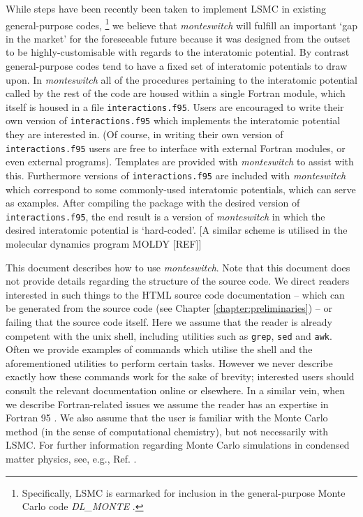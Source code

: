\documentclass{report}
\begin{document}
While steps have been recently been taken to implement LSMC in existing general-purpose codes,
\footnote{Specifically, LSMC is earmarked for inclusion in the general-purpose Monte Carlo code \emph{DL\_MONTE} \cite{Purton_2013}.}
we believe that \emph{monteswitch} will fulfill
an important `gap in the market' for the foreseeable future because it was designed from the outset to be highly-customisable with regards to the 
interatomic potential. By contrast general-purpose codes tend to have a fixed set of interatomic potentials to draw upon.
In \emph{monteswitch} all of the procedures pertaining to the interatomic potential called by the rest of the code are housed within 
a single Fortran module, which itself is housed in a file \texttt{interactions.f95}. 
Users are encouraged to write their own version of \texttt{interactions.f95} which implements the interatomic potential they are interested in.
(Of course, in writing their own version of \texttt{interactions.f95} users are free to interface with external Fortran modules, or even external 
programs). 
Templates are provided with \emph{monteswitch} to assist with this. Furthermore versions of \texttt{interactions.f95} are included
with \emph{monteswitch} which correspond to some commonly-used interatomic potentials, which can serve as examples.
After compiling the package with the desired version of \texttt{interactions.f95}, the end result is a version of \emph{monteswitch} 
in which the desired interatomic potential is `hard-coded'.
[A similar scheme is utilised in the molecular dynamics program MOLDY [REF]]

This document describes how to use \emph{monteswitch}. Note that this document does not provide details regarding the structure of the source code. 
We direct readers interested in such things to the HTML source code documentation -- which can be generated from the source code (see Chapter
\ref{chapter:preliminaries}) -- or failing that the source code itself. Here we assume that the reader is already competent with the unix shell, 
including utilities such as \texttt{grep}, \texttt{sed} and \texttt{awk}. Often we provide examples of commands which utilise the shell and the 
aforementioned utilities to perform certain tasks. However we never describe exactly how these commands work for the sake of brevity; interested users
should consult the relevant documentation online or elsewhere. In a similar vein, when we describe Fortran-related issues we assume the reader has 
an expertise in Fortran 95 . We also assume that the user is familiar with the Monte Carlo method (in the sense of computational
chemistry), but not necessarily with LSMC. For further information regarding Monte Carlo simulations in condensed 
matter physics, see, e.g., Ref. \cite{book:Frenkel}. 
\end{document}
